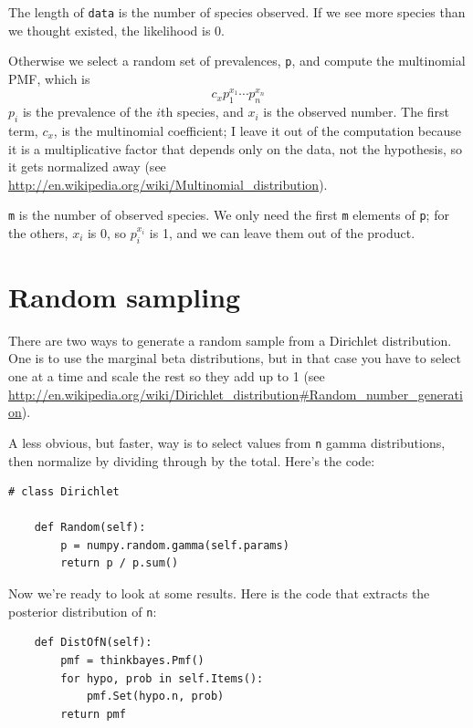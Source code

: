 \documentclass[12pt]{book}
\begin{document}
The length of {\tt data} is the number of species observed.  If
we see more species than we thought existed, the likelihood is 0.

Otherwise we select a random set of prevalences, {\tt p}, and
compute the multinomial PMF, which is
%
\[ c_x  p_1^{x_1} \cdots p_n^{x_n} \]
%
$p_i$ is the prevalence of the $i$th species, and $x_i$ is the
observed number.  The first term, $c_x$, is the multinomial
coefficient; I leave it out of the computation because it is
a multiplicative factor that depends only
on the data, not the hypothesis, so it gets normalized away
(see \url{http://en.wikipedia.org/wiki/Multinomial_distribution}).

{\tt m} is the number of observed species.
We only need the first {\tt m} elements of {\tt p};
for the others, $x_i$ is 0, so
$p_i^{x_i}$ is 1, and we can leave them out of the product.


\section{Random sampling}
\label{randomdir}

There are two ways to generate a random sample from a Dirichlet
distribution.  One is to use the marginal beta distributions, but in
that case you have to select one at a time and scale the rest so they
add up to 1 (see
\url{http://en.wikipedia.org/wiki/Dirichlet_distribution#Random_number_generation}).

A less obvious, but faster, way is to select values from {\tt n} gamma
distributions, then normalize by dividing through by the total. 
Here's the code:

\begin{verbatim}
# class Dirichlet

    def Random(self):
        p = numpy.random.gamma(self.params)
        return p / p.sum()
\end{verbatim}

Now we're ready to look at some results.  Here is the code that extracts
the posterior distribution of {\tt n}:

\begin{verbatim}
    def DistOfN(self):
        pmf = thinkbayes.Pmf()
        for hypo, prob in self.Items():
            pmf.Set(hypo.n, prob)
        return pmf
\end{verbatim}
\end{document}
